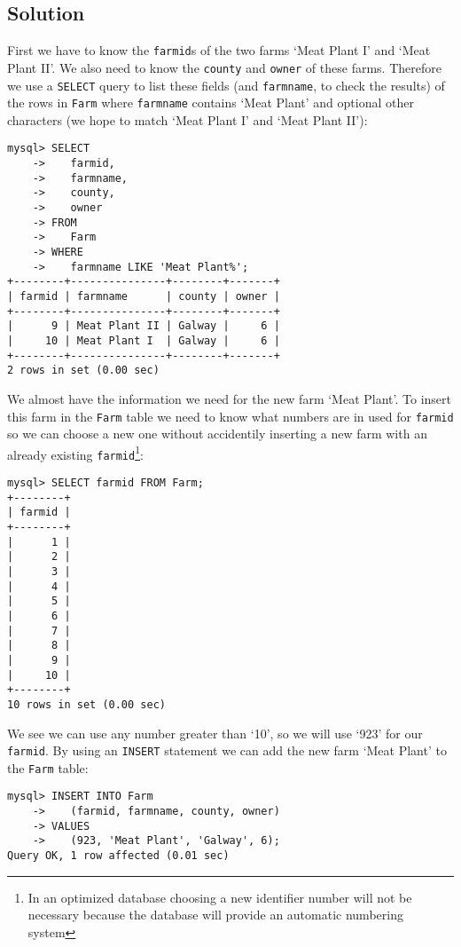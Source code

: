 \documentclass[11pt]{article}
\begin{document}
\subsection*{Solution}

First we have to know the \verb|farmid|s of the two farms `Meat Plant I' and `Meat Plant II'. We also need to know the \verb|county| and \verb|owner| of these farms. Therefore we use a \verb|SELECT| query to list these fields (and \verb|farmname|, to check the results) of the rows in \verb|Farm| where \verb|farmname| contains `Meat Plant' and optional other characters (we hope to match `Meat Plant I' and `Meat Plant II'):

\begin{verbatim}
mysql> SELECT
    ->    farmid,
    ->    farmname,
    ->    county,
    ->    owner
    -> FROM
    ->    Farm
    -> WHERE
    ->    farmname LIKE 'Meat Plant%';
+--------+---------------+--------+-------+
| farmid | farmname      | county | owner |
+--------+---------------+--------+-------+
|      9 | Meat Plant II | Galway |     6 |
|     10 | Meat Plant I  | Galway |     6 |
+--------+---------------+--------+-------+
2 rows in set (0.00 sec)
\end{verbatim}

We almost have the information we need for the new farm `Meat Plant'. To insert this farm in the \verb|Farm| table we need to know what numbers are in used for \verb|farmid| so we can choose a new one without accidentily inserting a new farm with an already existing \verb|farmid|\footnote{In an optimized database choosing a new identifier number will not be necessary because the database will provide an automatic numbering system}:

\newpage

\begin{verbatim}
mysql> SELECT farmid FROM Farm;
+--------+
| farmid |
+--------+
|      1 |
|      2 |
|      3 |
|      4 |
|      5 |
|      6 |
|      7 |
|      8 |
|      9 |
|     10 |
+--------+
10 rows in set (0.00 sec)
\end{verbatim}

We see we can use any number greater than `10', so we will use `923' for our \verb|farmid|. By using an \verb|INSERT| statement we can add the new farm `Meat Plant' to the \verb|Farm| table:

\begin{verbatim}
mysql> INSERT INTO Farm
    ->    (farmid, farmname, county, owner)
    -> VALUES
    ->    (923, 'Meat Plant', 'Galway', 6);
Query OK, 1 row affected (0.01 sec)
\end{verbatim}
\end{document}
